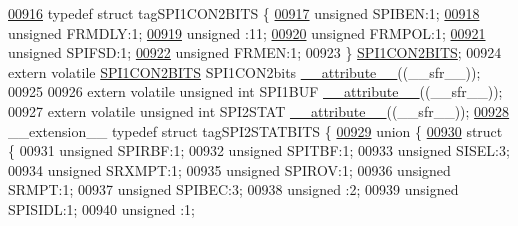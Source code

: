 \begin{DoxyCode}
\hypertarget{a00009_source_l00916}{}\hyperlink{a00008}{00916} \textcolor{keyword}{typedef} \textcolor{keyword}{struct }tagSPI1CON2BITS \{
\hypertarget{a00009_source_l00917}{}\hyperlink{a00008_a48f1b49d7589da2ee8c38cd6d820a542}{00917}   \textcolor{keywordtype}{unsigned} SPIBEN:1;
\hypertarget{a00009_source_l00918}{}\hyperlink{a00008_abc2e71af924cda26b91c8945dc68c1d4}{00918}   \textcolor{keywordtype}{unsigned} FRMDLY:1;
\hypertarget{a00009_source_l00919}{}\hyperlink{a00008_adf71f3d8410c1f1dbbc96680a92c49af}{00919}   \textcolor{keywordtype}{unsigned} :11;
\hypertarget{a00009_source_l00920}{}\hyperlink{a00008_a3f77b33ab0ae8182d247d8a75ce9795f}{00920}   \textcolor{keywordtype}{unsigned} FRMPOL:1;
\hypertarget{a00009_source_l00921}{}\hyperlink{a00008_aeb3b552a9f7c25bc1ae09655904e34cc}{00921}   \textcolor{keywordtype}{unsigned} SPIFSD:1;
\hypertarget{a00009_source_l00922}{}\hyperlink{a00008_a312bafba1b24944c8dfc39323e8fd4e9}{00922}   \textcolor{keywordtype}{unsigned} FRMEN:1;
00923 \} \hyperlink{a00008_d3/d4f/a00761}{SPI1CON2BITS};
00924 \textcolor{keyword}{extern} \textcolor{keyword}{volatile} \hyperlink{a00008_d3/d4f/a00761}{SPI1CON2BITS} SPI1CON2bits \hyperlink{a00009_a493c46f03454991ccc5aa7a6e1dfb2a7}{\_\_attribute\_\_}((\_\_sfr\_\_));
00925 
00926 \textcolor{keyword}{extern} \textcolor{keyword}{volatile} \textcolor{keywordtype}{unsigned} \textcolor{keywordtype}{int}  SPI1BUF \hyperlink{a00009_a493c46f03454991ccc5aa7a6e1dfb2a7}{\_\_attribute\_\_}((\_\_sfr\_\_));
00927 \textcolor{keyword}{extern} \textcolor{keyword}{volatile} \textcolor{keywordtype}{unsigned} \textcolor{keywordtype}{int}  SPI2STAT \hyperlink{a00009_a493c46f03454991ccc5aa7a6e1dfb2a7}{\_\_attribute\_\_}((\_\_sfr\_\_));
\hypertarget{a00009_source_l00928}{}\hyperlink{a00008}{00928} \_\_extension\_\_ \textcolor{keyword}{typedef} \textcolor{keyword}{struct }tagSPI2STATBITS \{
\hypertarget{a00009_source_l00929}{}\hyperlink{a00009}{00929}   \textcolor{keyword}{union }\{
\hypertarget{a00009_source_l00930}{}\hyperlink{a00009}{00930}     \textcolor{keyword}{struct }\{
00931       \textcolor{keywordtype}{unsigned} SPIRBF:1;
00932       \textcolor{keywordtype}{unsigned} SPITBF:1;
00933       \textcolor{keywordtype}{unsigned} SISEL:3;
00934       \textcolor{keywordtype}{unsigned} SRXMPT:1;
00935       \textcolor{keywordtype}{unsigned} SPIROV:1;
00936       \textcolor{keywordtype}{unsigned} SRMPT:1;
00937       \textcolor{keywordtype}{unsigned} SPIBEC:3;
00938       \textcolor{keywordtype}{unsigned} :2;
00939       \textcolor{keywordtype}{unsigned} SPISIDL:1;
00940       \textcolor{keywordtype}{unsigned} :1;

\end{DoxyCode}
